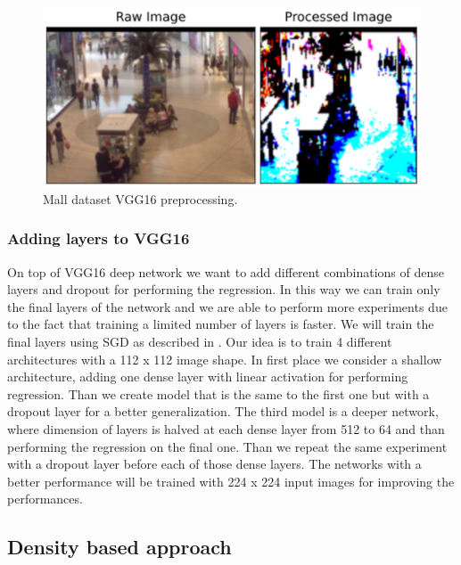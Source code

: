 \documentclass[10pt,twocolumn,letterpaper]{article}
\begin{document}
\begin{figure}[h!]%
	\includegraphics[width=0.9\columnwidth]{pics/preprocess.png}
	\centering
	\caption{Mall dataset VGG16 preprocessing.}
	\centering
	\label{fig:preprocess}
\end{figure}

\subsubsection{Adding layers to VGG16 }

On top of VGG16 deep network we want to add different combinations of dense layers and dropout for performing the regression. In this way we can train only the final layers of the network and we are able to perform more experiments due to the fact that training a limited number of layers is faster. We will train the final layers using SGD as described in \cite{li2018csrnet}. Our idea is to train 4 different architectures with a 112 x 112 image shape. In first place we consider a shallow architecture, adding one dense layer with linear activation for performing regression. Than we create model that is the same to the first one but with a dropout layer for a better generalization. The third model is a deeper network, where dimension of layers is halved at each dense layer from 512 to 64 and than performing the regression on the final one. Than we repeat the same experiment with a dropout layer before each of those dense layers. The networks with a better performance will be trained with 224 x 224 input images for improving the performances. 

\subsection{Density based approach}
\end{document}
